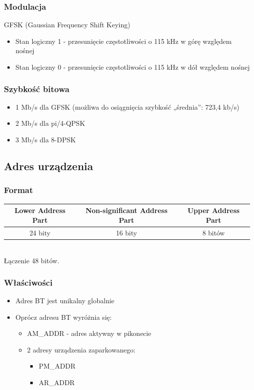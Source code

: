 \subsubsection{Modulacja}
GFSK (Gaussian Frequency Shift Keying)\\
\begin{itemize}
	\item Stan logiczny 1 - przesunięcie częstotliwości o 115 kHz w górę względem nośnej
	\item Stan logiczny 0 - przesunięcie częstotliwości o 115 kHz w dół względem nośnej
\end{itemize}
\subsubsection{Szybkość bitowa}
\begin{itemize}
	\item 1 Mb/s dla GFSK (możliwa do osiągnięcia szybkość „średnia”: 723,4 kb/s)
	\item 2 Mb/s dla pi/4-QPSK
	\item 3 Mb/s dla 8-DPSK
\end{itemize}


\subsection{Adres urządzenia}
\subsubsection{Format}
\begin{tabular}{|c|c|c|}
	\hline Lower Address Part & Non-significant Address Part & Upper Address Part \\ 
	\hline 24 bity & 16 bity & 8 bitów \\ 
	\hline 
\end{tabular}\\
Łączenie 48 bitów.
\subsubsection{Właściwości}
\begin{itemize}
	\item Adres BT jest unikalny globalnie
	\item Oprócz adresu BT wyróżnia się:
	\begin{itemize}
		\item AM\_ADDR - adres aktywny w pikonecie
		\item 2 adresy urządzenia zaparkowanego:
		\begin{itemize}
			\item PM\_ADDR
			\item AR\_ADDR
		\end{itemize}
	\end{itemize}
\end{itemize}

